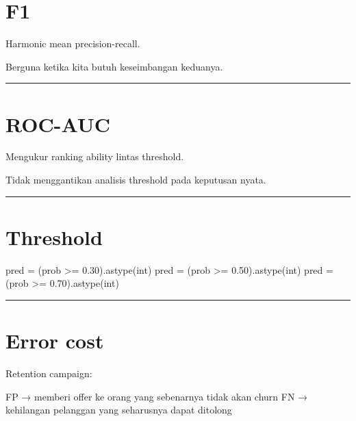 \documentclass[
  indonesian,
  letterpaper,
  DIV=11,
  numbers=noendperiod]{scrreprt}
\newenvironment{Shaded}{\begin{snugshade}}{\end{snugshade}}
\newcommand{\BuiltInTok}[1]{\textcolor[rgb]{0.00,0.23,0.31}{#1}}
\newcommand{\FloatTok}[1]{\textcolor[rgb]{0.68,0.00,0.00}{#1}}
\newcommand{\NormalTok}[1]{\textcolor[rgb]{0.00,0.23,0.31}{#1}}
\newcommand{\OperatorTok}[1]{\textcolor[rgb]{0.37,0.37,0.37}{#1}}
\begin{document}
\section{F1}\label{f1}

Harmonic mean precision-recall.

Berguna ketika kita butuh keseimbangan keduanya.

\begin{center}\rule{0.5\linewidth}{0.5pt}\end{center}

\section{ROC-AUC}\label{roc-auc}

Mengukur ranking ability lintas threshold.

Tidak menggantikan analisis threshold pada keputusan nyata.

\begin{center}\rule{0.5\linewidth}{0.5pt}\end{center}

\section{Threshold}\label{threshold}

\begin{Shaded}
\begin{Highlighting}[]
\NormalTok{pred }\OperatorTok{=}\NormalTok{ (prob }\OperatorTok{\textgreater{}=} \FloatTok{0.30}\NormalTok{).astype(}\BuiltInTok{int}\NormalTok{)}
\NormalTok{pred }\OperatorTok{=}\NormalTok{ (prob }\OperatorTok{\textgreater{}=} \FloatTok{0.50}\NormalTok{).astype(}\BuiltInTok{int}\NormalTok{)}
\NormalTok{pred }\OperatorTok{=}\NormalTok{ (prob }\OperatorTok{\textgreater{}=} \FloatTok{0.70}\NormalTok{).astype(}\BuiltInTok{int}\NormalTok{)}
\end{Highlighting}
\end{Shaded}

\begin{center}\rule{0.5\linewidth}{0.5pt}\end{center}

\section{Error cost}\label{error-cost}

Retention campaign:

\begin{Shaded}
\begin{Highlighting}[]
\NormalTok{FP → memberi offer ke orang yang sebenarnya tidak akan churn}
\NormalTok{FN → kehilangan pelanggan yang seharusnya dapat ditolong}
\end{Highlighting}
\end{Shaded}
\end{document}
